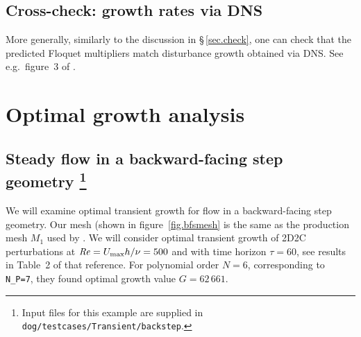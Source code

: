 \documentclass[11pt,a4paper]{report}
\newcommand\Rey{\mbox{\textit{Re}}}
\newcommand{\eg}{e.g.\ }
\begin{document}
\section{Cross-check: growth rates via DNS}
\label{sec.checkflo}

More generally, similarly to the discussion in \S\,\ref{sec.check}, one
can check that the predicted Floquet multipliers match disturbance
growth obtained via DNS.  See \eg figure~3 of \citet{hb96}.


\chapter{Optimal growth analysis}
\label{ch.tg}


\section{Steady flow in a backward-facing step geometry
\protect\footnote{Input files for this example are supplied in
  \texttt{dog/testcases/Transient/backstep}.}  }
\label{sec.bfsTG}

We will examine optimal transient growth for flow in a backward-facing
step geometry.  Our mesh (shown in figure~\ref{fig.bfsmesh} is the
same as the production mesh $M_1$ used by \citet{bbs08a}.  We will
consider optimal transient growth of 2D2C perturbations at
$\Rey=U_{\max}h/\nu=500$ and with time horizon $\tau=60$, see results
in Table~2 of that reference.  For polynomial order $N=6$,
corresponding to \verb+N_P=7+, they found optimal growth value
$G=62\,661$.
\end{document}
